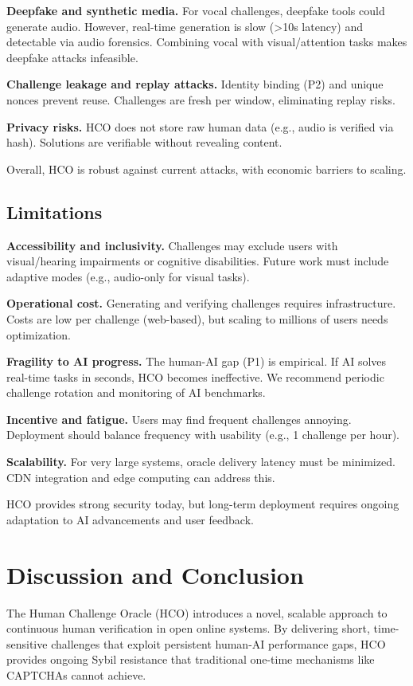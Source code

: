 \documentclass[sigconf,nonacm]{acmart}
\begin{document}
\textbf{Deepfake and synthetic media.} For vocal challenges, deepfake tools could generate audio. However, real-time generation is slow (>10s latency) and detectable via audio forensics. Combining vocal with visual/attention tasks makes deepfake attacks infeasible.

\textbf{Challenge leakage and replay attacks.} Identity binding (P2) and unique nonces prevent reuse. Challenges are fresh per window, eliminating replay risks.

\textbf{Privacy risks.} HCO does not store raw human data (e.g., audio is verified via hash). Solutions are verifiable without revealing content.

Overall, HCO is robust against current attacks, with economic barriers to scaling.

\subsection{Limitations}

\textbf{Accessibility and inclusivity.} Challenges may exclude users with visual/hearing impairments or cognitive disabilities. Future work must include adaptive modes (e.g., audio-only for visual tasks).

\textbf{Operational cost.} Generating and verifying challenges requires infrastructure. Costs are low per challenge (web-based), but scaling to millions of users needs optimization.

\textbf{Fragility to AI progress.} The human-AI gap (P1) is empirical. If AI solves real-time tasks in seconds, HCO becomes ineffective. We recommend periodic challenge rotation and monitoring of AI benchmarks.

\textbf{Incentive and fatigue.} Users may find frequent challenges annoying. Deployment should balance frequency with usability (e.g., 1 challenge per hour).

\textbf{Scalability.} For very large systems, oracle delivery latency must be minimized. CDN integration and edge computing can address this.

HCO provides strong security today, but long-term deployment requires ongoing adaptation to AI advancements and user feedback.

\section{Discussion and Conclusion}

The Human Challenge Oracle (HCO) introduces a novel, scalable approach to continuous human verification in open online systems. By delivering short, time-sensitive challenges that exploit persistent human-AI performance gaps, HCO provides ongoing Sybil resistance that traditional one-time mechanisms like CAPTCHAs cannot achieve.
\end{document}
